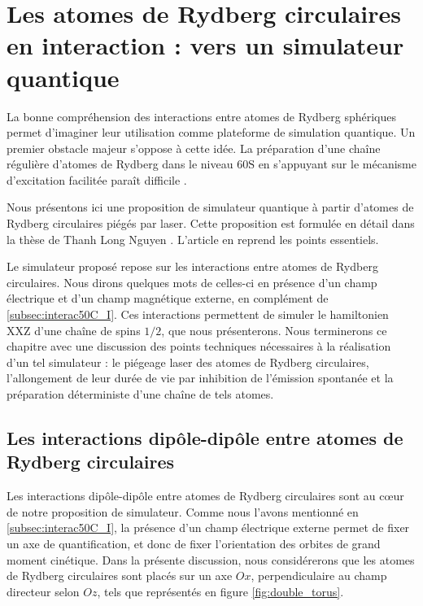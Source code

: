 \chapter{Les atomes de Rydberg circulaires en interaction : vers un simulateur quantique}
\label{chapter:circsim}

\noindent La bonne compréhension des interactions entre atomes de Rydberg sphériques permet d'imaginer leur utilisation comme plateforme de simulation quantique.
Un premier obstacle majeur s'oppose à cette idée.
La préparation d'une chaîne régulière d'atomes de Rydberg dans le niveau $\mathrm{60S}$ en s'appuyant sur le mécanisme d'excitation facilitée paraît difficile \cite{PHD_NGUYEN}.

Nous présentons ici une proposition de simulateur quantique à partir d'atomes de Rydberg circulaires piégés par laser.
Cette proposition est formulée en détail dans la thèse de Thanh Long Nguyen \cite{PHD_NGUYEN}.
L'article \cite{ENS_PRE_CIRCSIM} en reprend les points essentiels.

Le simulateur proposé repose sur les interactions entre atomes de Rydberg circulaires.
Nous dirons quelques mots de celles-ci en présence d'un champ électrique et d'un champ magnétique externe, en complément de \ref{subsec:interac50C_I}.
Ces interactions permettent de simuler le hamiltonien \og XXZ \fg{} d'une chaîne de spins $1/2$, que nous présenterons.
Nous terminerons ce chapitre avec une discussion des points techniques nécessaires à la réalisation d'un tel simulateur : le piégeage laser des atomes de Rydberg circulaires, l'allongement de leur durée de vie par inhibition de l'émission spontanée et la préparation déterministe d'une chaîne de tels atomes.


\section{Les interactions dipôle-dipôle entre atomes de Rydberg circulaires}
\noindent Les interactions dipôle-dipôle entre atomes de Rydberg circulaires sont au c\oe ur de notre proposition de simulateur.
Comme nous l'avons mentionné en \ref{subsec:interac50C_I}, la présence d'un champ électrique externe permet de fixer un axe de quantification, et donc de fixer l'orientation des orbites de grand moment cinétique.
Dans la présente discussion, nous considérerons que les atomes de Rydberg circulaires sont placés sur un axe $Ox$, perpendiculaire au champ directeur selon $Oz$, tels que représentés en figure \eqref{fig:double_torus}.

